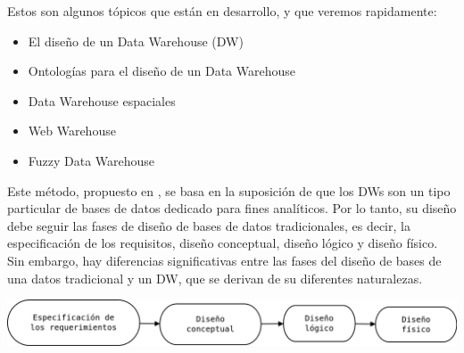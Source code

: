 \documentclass{fancyslides}
\begin{document}
\startingslide %

\begin{frame}
\end{frame}

\begin{frame}
\misc
{
Estos son algunos tópicos que están en desarrollo, y que veremos rapidamente:
\begin{itemize}
  \item El diseño de un Data Warehouse (DW)
  \item Ontologías para el diseño de un Data Warehouse
  \item Data Warehouse espaciales
  \item Web Warehouse
  \item Fuzzy Data Warehouse
\end{itemize}
}
\end{frame}

\begin{frame}
\end{frame}

\begin{frame}
\misc
{

 \justifying Este método, propuesto en \cite{VaismanZimanyi14}, se basa en la suposición de que los DWs son un tipo particular de bases de datos dedicado para fines analíticos. Por lo tanto, su diseño debe seguir las fases de diseño de bases de datos tradicionales, es decir, la especificación de los requisitos, diseño conceptual, diseño lógico y diseño físico. Sin embargo, hay diferencias significativas entre las fases del diseño de bases de una datos tradicional y un DW, que se derivan de su diferentes naturalezas.

\begin{center}
\includegraphics[scale=0.25]{diseno1}  
\end{center}

}
\end{frame}
\end{document}
